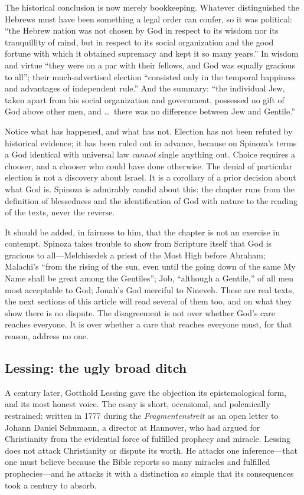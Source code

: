 The historical conclusion is now merely bookkeeping. Whatever distinguished the Hebrews must have been something a legal order can confer, so it was political: ``the Hebrew nation was not chosen by God in respect to its wisdom nor its tranquillity of mind, but in respect to its social organization and the good fortune with which it obtained supremacy and kept it so many years.'' In wisdom and virtue ``they were on a par with their fellows, and God was equally gracious to all''; their much-advertised election ``consisted only in the temporal happiness and advantages of independent rule.'' And the summary: ``the individual Jew, taken apart from his social organization and government, possessed no gift of God above other men, and \ldots\ there was no difference between Jew and Gentile.''

Notice what has happened, and what has not. Election has not been refuted by historical evidence; it has been ruled out in advance, because on Spinoza's terms a God identical with universal law \emph{cannot} single anything out. Choice requires a chooser, and a chooser who could have done otherwise. The denial of particular election is not a discovery about Israel. It is a corollary of a prior decision about what God is. Spinoza is admirably candid about this: the chapter runs from the definition of blessedness and the identification of God with nature to the reading of the texts, never the reverse.

It should be added, in fairness to him, that the chapter is not an exercise in contempt. Spinoza takes trouble to show from Scripture itself that God is gracious to all---Melchisedek a priest of the Most High before Abraham; Malachi's ``from the rising of the sun, even until the going down of the same My Name shall be great among the Gentiles''; Job, ``although a Gentile,'' of all men most acceptable to God; Jonah's God merciful to Nineveh. These are real texts, the next sections of this article will read several of them too, and on what they show there is no dispute. The disagreement is not over whether God's care reaches everyone. It is over whether a care that reaches everyone must, for that reason, address no one.

\subsection{Lessing: the ugly broad ditch}

A century later, Gotthold Lessing gave the objection its epistemological form, and its most honest voice. The essay is short, occasional, and polemically restrained: written in 1777 during the \emph{Fragmentenstreit} as an open letter to Johann Daniel Schumann, a director at Hannover, who had argued for Christianity from the evidential force of fulfilled prophecy and miracle. Lessing does not attack Christianity or dispute its worth. He attacks one inference---that one must believe because the Bible reports so many miracles and fulfilled prophecies---and he attacks it with a distinction so simple that its consequences took a century to absorb.


